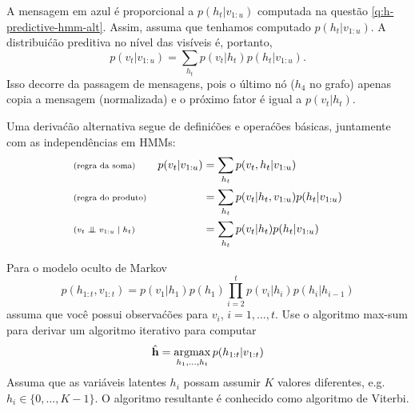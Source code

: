 \begin{exenumerate}
\begin{solution}
\begin{center}
{}
        \end{center}
        A mensagem em azul \'e proporcional a $p(h_t|v_{1:u})$ computada
        na quest\~ao \ref{q:h-predictive-hmm-alt}. Assim, assuma que tenhamos
        computado $p(h_t|v_{1:u})$. A distribui\'c\~ao preditiva no
        n\'ivel das vis\'iveis \'e, portanto,
        \begin{equation}
            p(v_t | v_{1:u}) = \sum_{h_t} p(v_t|h_t) p(h_t|v_{1:u}).
        \end{equation}
        Isso decorre da passagem de mensagens, pois o \'ultimo n\'o ($h_4$ no
        grafo) apenas copia a mensagem (normalizada) e o pr\'oximo
        fator \'e igual a $p(v_t|h_t)$.
        
        Uma deriva\'c\~ao alternativa segue de defini\'c\~oes e
        opera\'c\~oes b\'asicas, juntamente com as independ\^encias em HMMs:
        \begin{align}
            &\text{\scriptsize (regra da soma)}&  p(v_t | v_{1:u}) &= \sum_{h_t} p(v_t, h_t|v_{1:u})\\
            &\text{\scriptsize (regra do produto)}&  & = \sum_{h_t} p(v_t|h_t, v_{1:u}) p(h_t|v_{1:u})\\
            &\text{\scriptsize ($v_t \mathrel{\perp\mspace{-10mu}\perp} v_{1:u} \mid h_t$)}&   & = \sum_{h_t} p(v_t|h_t) p(h_t|v_{1:u})
        \end{align}
    \end{solution}
    
\end{exenumerate}


Para o modelo oculto de Markov
$$ p(h_{1:t},v_{1:t}) = p(v_1|h_1)p(h_1)\prod_{i=2}^t
p(v_i|h_i)p(h_i|h_{i-1})$$ assuma que voc\^e possui observa\'c\~oes para $v_i$,
$i=1, \ldots, t$. Use o algoritmo max-sum para derivar um algoritmo iterativo para computar
\begin{equation}
    \hat{\mathbf{h}} = \operatorname*{\mathrm{argmax}}_{h_1, \ldots, h_t}  p(h_{1:t}|v_{1:t})
\end{equation}
Assuma que as vari\'aveis latentes $h_i$ possam assumir $K$ valores diferentes,
e.g.\ $h_i \in \{0,\ldots, K-1\}$. O algoritmo resultante \'e conhecido como
algoritmo de Viterbi.

